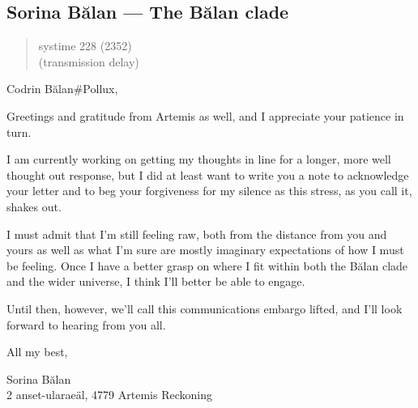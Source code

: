 \hypertarget{sorina-bux103lan-the-bux103lan-clade}{%
\subsection{Sorina Bălan — The Bălan clade}\label{sorina-bux103lan-the-bux103lan-clade}}

\begin{quote}
systime 228 (2352)\\
(transmission delay)
\end{quote}

Codrin Bălan\#Pollux,

Greetings and gratitude from Artemis as well, and I appreciate your patience in turn.

I am currently working on getting my thoughts in line for a longer, more well thought out response, but I did at least want to write you a note to acknowledge your letter and to beg your forgiveness for my silence as this stress, as you call it, shakes out.

I must admit that I'm still feeling raw, both from the distance from you and yours as well as what I'm sure are mostly imaginary expectations of how I must be feeling. Once I have a better grasp on where I fit within both the Bălan clade and the wider universe, I think I'll better be able to engage.

Until then, however, we'll call this communications embargo lifted, and I'll look forward to hearing from you all.

All my best,

Sorina Bălan\\
2 anset-ularaeäl, 4779 Artemis Reckoning
